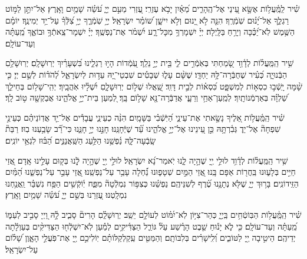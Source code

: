 \documentclass[twoside, openany, parskip=half, 11pt]{book}
\begin{document}
 שִׁ֗יר 
 לַֽמַּֽ֫עֲל֥וֹת אֶשָּׂ֣א עֵ֭ינַי אֶל־הֶֽהָרִ֑ים מֵ֝אַ֗יִן יָבֹ֥א עֶזְרִֽי׃ עֶ֭זְרִי מֵעִ֣ם יְיָ֑ עֹ֝שֵׂ֗ה שָׁמַ֥יִם וָאָֽרֶץ׃ אַל־יִתֵּ֣ן לַמּ֣וֹט רַגְלֶ֑ךָ אַל־יָ֝נ֗וּם שֹֽׁמְֿרֶֽךָ׃ הִנֵּ֤ה לֹ֣א יָ֭נוּם וְלֹ֣א יִישָׁ֑ן שׁ֝וֹמֵ֗ר יִשְׂרָאֵֽל׃ יְיָ֥ שֹֽׁמְֿרֶ֑ךָ יְיָ֥ צִ֝לְּֿךָ֗ עַל־יַ֥ד יְמִינֶֽךָ׃ יוֹמָ֗ם הַשֶּׁ֥מֶשׁ לֹֽא־יַ֝כֶּ֗כָּה וְיָרֵ֥חַ בַּלָּֽיְלָה׃ יְיָ֗ יִשְׁמָרְךָ֥ מִכָּל־רָ֑ע יִ֝שְׁמֹ֗ר אֶת־נַפְשֶֽׁךָ׃ יְיָ֗ יִשְׁמָר־צֵֽאתְֿךָ֥ וּבוֹאֶ֑ךָ מֵֽ֝עַתָּ֗ה וְעַד־עוֹלָֽם׃

 שִׁ֥יר
  הַֽמַּֽעֲל֗וֹת לְדָ֫וִ֥ד שָׂ֭מַחְתִּי בְּאֹֽמְֿרִ֣ים לִ֑י בֵּ֖ית יְיָ֣ נֵלֵֽךְ׃ עֹֽ֭מְֿדוֹת הָי֣וּ רַגְלֵ֑ינוּ בִּ֝שְׁעָרַ֗יִךְ יְרֽוּשָׁלָֽםִ׃ יְרֽוּשָׁלַ֥םִ הַבְּֿנוּיָ֑ה כְּ֝עִ֗יר שֶׁחֻבְּֿרָה־לָּ֥הּ יַחְדָּֽו׃ שֶׁשָּׁ֨ם עָל֢וּ שְׁבָטִ֡ים שִׁבְטֵי־יָ֭הּ עֵד֣וּת לְיִשְׂרָאֵ֑ל לְ֝הֹד֗וֹת לְשֵׁ֣ם יְיָ׃ כִּ֤י שָׁ֨מָּה יָֽשְֿׁב֣וּ כִסְא֣וֹת לְמִשְׁפָּ֑ט כִּ֝סְא֗וֹת לְבֵ֣ית דָּוִֽד׃ שַֽׁ֭אֲלוּ שְׁל֣וֹם יְרֽוּשָׁלָ֑םִ יִ֝שְׁלָ֗יוּ אֹֽהֲבָֽיִךְ׃ יְהִֽי־שָׁל֥וֹם בְּחֵילֵ֑ךְ שַׁ֝לְוָ֗ה בְּאַרְמְֿנוֹתָֽיִךְ׃ לְמַֽעַן־אַחַ֥י וְרֵעָ֑י אֲדַבְּֿרָה־נָּ֖א שָׁל֣וֹם בָּֽךְ׃ לְ֭מַעַן בֵּית־יְיָ֣ אֱלֹהֵ֑ינוּ אֲבַקְשָׁ֖ה ט֣וֹב לָֽךְ׃

 שִׁ֗יר
  הַֽמַּֽ֫עֲל֥וֹת אֵ֭לֶיךָ נָשָׂ֣אתִי אֶת־עֵינַ֑י הַ֝יֹּֽשְֿׁבִ֗י בַּשָּׁמָֽיִם׃ הִנֵּ֨ה כְעֵינֵ֢י עֲבָדִ֡ים אֶל־יַ֤ד אֲדֽוֹנֵיהֶ֗ם כְּעֵינֵ֣י שִׁפְחָה֘ אֶל־יַד֢ גְּבִ֫רְתָּ֥הּ כֵּ֣ן עֵ֭ינֵינוּ אֶל־יְיָ֣ אֱלֹהֵ֑ינוּ עַ֝֗ד שֶׁיְּֿחָנֵּֽנוּ׃ חָנֵּ֣נוּ יְיָ֣ חָנֵּ֑נוּ כִּי־רַ֝֗ב שָׂבַ֥עְנוּ בֽוּז׃ רַבַּת֘ שָֽׂבְֿעָה־לָּ֢הּ נַ֫פְשֵׁ֥נוּ הַלַּ֥עַג הַשַּֽׁאֲנַנִּ֑ים הַ֝בּ֗וּז לִגְאֵ֥י יוֹנִֽים׃


 שִׁ֥יר   הַֽמַּֽעֲל֗וֹת לְדָ֫וִ֥ד לוּלֵ֣י יְ֖יָ שֶׁהָ֣יָה לָ֑נוּ יֹֽאמַר־נָ֝א יִשְׂרָאֵֽל׃ לוּלֵ֣י יְ֖יָ שֶׁהָ֣יָה לָֿ֑נוּ בְּק֖וּם עָלֵ֣ינוּ אָֽדָם׃ אֲ֭זַי חַיִּ֣ים בְּלָע֑וּנוּ בַּֽחֲר֖וֹת אַפָּם בָּֽנוּ׃ אֲ֭זַי הַמַּ֣יִם שְׁטָפ֑וּנוּ נַ֝֗חְלָה עָבַ֥ר עַל־נַפְשֵֽׁנוּ׃ אֲ֭זַי עָבַ֣ר עַל־נַפְשֵׁ֑נוּ הַ֝מַּ֗יִם הַזֵּֽידוֹנִֽים׃ בָּר֥וּךְ יְיָ֑ שֶׁלֹּ֖א נְתָנָ֥נוּ טֶ֝֗רֶף לְשִׁנֵּיהֶֽם׃ נַפְשֵׁ֗נוּ כְּצִפּ֥וֹר נִמְלְֿטָה֘ מִפַּ֢ח יֽ֫וֹקְֿשִׁ֥ים הַפַּ֥ח נִשְׁבַּ֗ר וַֽאֲנַ֥חְנוּ נִמְלָֽטְנוּ׃ עֶ֭זְרֵנוּ בְּשֵׁ֣ם יְיָ֑ עֹ֝שֵׂ֗ה שָׁמַ֥יִם וָאָֽרֶץ׃

 שִׁ֗יר   הַֽמַּֽ֫עֲל֥וֹת הַבּֽוֹטְֿחִ֥ים בַּֽיְיָ֑ כְּהַר־צִיּ֥וֹן לֹֽא־יִ֝מּ֗וֹט לְעוֹלָ֥ם יֵשֵֽׁב׃ יְרְוּשָׁלְַ֗םִ הָרִים֘ סָבִ֢יב לָ֥֫הּ וַ֭יְיָ סָבִ֣יב לְעַמּ֑וֹ מֵֽ֝עַתָּ֗ה וְעַד־עוֹלָֽם׃ כִּ֤י לֹ֢א יָנ֡וּחַ שֵׁ֤בֶט הָרֶ֗שַׁע עַל֘ גּוֹרַ֢ל הַצַּדִּ֫יקִ֥ים לְמַ֡עַן לֹֽא־יִשְׁלְֿח֖וּ הַצַּדִּיקִ֨ים בְּעַוְלָ֬תָה יְדֵיהֶֽם׃ הֵיטִ֣יבָה יְ֖יָ לַטּוֹבִ֑ים וְ֝לִֽישָׁרִ֗ים בְּלִבּוֹתָֽם׃ וְהַמַּטִּ֤ים עַֽקַלְקַלּוֹתָ֗ם יֽוֹלִיכֵ֣ם יְ֖יָ אֶת־פֹּֽעֲלֵ֣י הָאָ֑וֶן שָׁ֝ל֗וֹם עַל־יִשְׂרָאֵֽל׃
\end{document}
